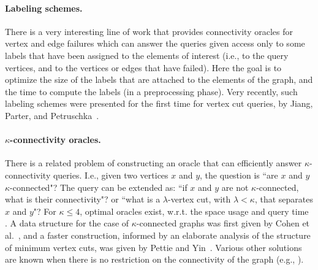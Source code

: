 \documentclass[11pt,a4paper]{article}
\begin{document}
\paragraph{Labeling schemes.} There is a very interesting line of work \cite{DBLP:conf/podc/DoryP21, DBLP:conf/wdag/ParterP22a, DBLP:conf/podc/IzumiEWM23, DBLP:conf/stoc/ParterPP24, DBLP:conf/soda/LongPS25} that provides connectivity oracles for vertex and edge failures which can answer the queries given access only to some labels that have been assigned to the elements of interest (i.e., to the query vertices, and to the vertices or edges that have failed). Here the goal is to optimize the size of the labels that are attached to the elements of the graph, and the time to compute the labels (in a preprocessing phase). Very recently, such labeling schemes were presented for the first time for vertex cut queries, by Jiang, Parter, and Petruschka~\cite{arxivMerav}.

\paragraph{$\kappa$-connectivity oracles.}
There is a related problem of constructing an oracle that can efficiently answer $\kappa$-connectivity queries. I.e., given two vertices $x$ and $y$, the question is ``are $x$ and $y$ $\kappa$-connected"? The query can be extended as: ``if $x$ and $y$ are not $\kappa$-connected, what is their connectivity"? or ``what is a $\lambda$-vertex cut, with $\lambda<\kappa$, that separates $x$ and $y$"? For $\kappa\leq 4$, optimal oracles exist, w.r.t. the space usage and query time \cite{DBLP:journals/algorithmica/BattistaT96,DBLP:conf/focs/KanevskyTBC91}. A data structure for the case of $\kappa$-connected graphs was first given by Cohen et al.~\cite{DBLP:conf/stoc/CohenBKT93}, and a faster construction, informed by an elaborate analysis of the structure of minimum vertex cuts, was given by Pettie and Yin~\cite{DBLP:conf/icalp/PettieY21}. Various other solutions are known when there is no restriction on the connectivity of the graph (e.g., \cite{DBLP:conf/esa/Nutov22,DBLP:conf/stoc/PettieSY22,DBLP:journals/corr/abs-2411-02658}).
\end{document}
